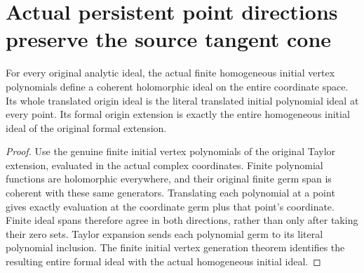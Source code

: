 \section{Actual persistent point directions preserve the source tangent cone}

\begin{lemma}
\label{hir:actual-source-cone-polynomial-model}
\leanok
For every original analytic ideal, the actual finite homogeneous initial vertex
polynomials define a coherent holomorphic ideal on the entire coordinate space.
Its whole translated origin ideal is the literal translated initial polynomial
ideal at every point. Its formal origin extension is exactly the entire
homogeneous initial ideal of the original formal extension.
\end{lemma}
\begin{proof}
Use the genuine finite initial vertex polynomials of the original Taylor
extension, evaluated in the actual complex coordinates. Finite polynomial
functions are holomorphic everywhere, and their original finite germ span
is coherent with these same generators. Translating each polynomial at a
point gives exactly evaluation at the coordinate germ plus that point's
coordinate. Finite ideal spans therefore agree in both directions, rather
than only after taking their zero sets. Taylor expansion sends each
polynomial germ to its literal polynomial inclusion. The finite initial
vertex generation theorem identifies the resulting entire formal ideal
with the actual homogeneous initial ideal.
\end{proof}

